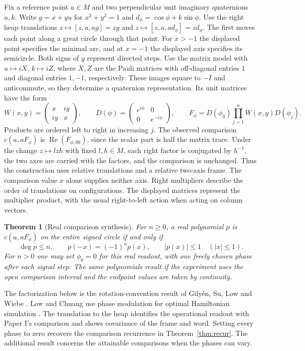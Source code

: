 \documentclass[11pt,reqno]{amsart}
\newtheorem{theorem}{Theorem}[section]
\theoremstyle{definition}
\theoremstyle{remark}
\numberwithin{equation}{section}
\newcommand{\re}{\operatorname{Re}}
\newcommand{\hp}[3]{[#1,#2,#3]}
\begin{document}
Fix a reference point $a\in M$ and two perpendicular unit imaginary quaternions $u,k$. Write $g=x+yu$ for $x^2+y^2=1$ and $d_\phi=\cos\phi+k\sin\phi$. Use the right heap translations $z\mapsto\hp{z}{a}{ag}=zg$ and $z\mapsto\hp{z}{a}{ad_\phi}=zd_\phi$. The first moves each point along a great circle through that point. For $x>-1$ the displaced point specifies the minimal arc, and at $x=-1$ the displayed axis specifies its semicircle. Both signs of $y$ represent directed steps. Use the matrix model with $u\mapsto iX$, $k\mapsto iZ$, where $X,Z$ are the Pauli matrices with off-diagonal entries $1$ and diagonal entries $1,-1$, respectively. These images square to $-I$ and anticommute, so they determine a quaternion representation. Its unit matrices have the form
\[
 W(x,y)=\begin{pmatrix}x&iy\\iy&x\end{pmatrix},\qquad
 D(\phi)=\begin{pmatrix}e^{i\phi}&0\\0&e^{-i\phi}\end{pmatrix},\qquad
 F_\phi=D(\phi_0)\prod_{j=1}^n W(x,y)D(\phi_j).
\]
Products are ordered left to right in increasing $j$. The observed comparison $c(a,aF_\phi)$ is $\re(F_{\phi,00})$, since the scalar part is half the matrix trace. Under the change $z\mapsto lzh$ with fixed $l,h\in M$, each right factor is conjugated by $h^{-1}$, the two axes are carried with the factors, and the comparison is unchanged. Thus the construction uses relative translations and a relative two-axis frame. The comparison value $x$ alone supplies neither axis. Right multipliers describe the order of translations on configurations. The displayed matrices represent the multiplier product, with the usual right-to-left action when acting on column vectors.

\begin{theorem}[Real comparison synthesis]\label{m4:real}
For $n\ge0$, a real polynomial $p$ is $c(a,aF_\phi)$ on the entire signed circle if and only if
\[
 \deg p\le n,\qquad p(-x)=(-1)^n p(x),\qquad
 |p(x)|\le1\quad (|x|\le1).
\]
For $n>0$ one may set $\phi_0=0$ for this real readout, with one freely chosen phase after each signal step. The same polynomials result if the experiment uses the open comparison interval and the endpoint values are taken by continuity.
\end{theorem}

The factorization below is the rotation-convention result of Gily\'en, Su, Low and Wiebe \cite[Theorems 3 and 5 and Lemma 6, arXiv v1]{m4:GSLW}. Low and Chuang use phase modulation for optimal Hamiltonian simulation \cite{m4:LC}. The translation to the heap identifies the operational readout with Paper I's comparison and shows covariance of the frame and word. Setting every phase to zero recovers the comparison recurrence in Theorem~\ref{thm:recur}. The additional result concerns the attainable comparisons when the phases can vary.
\end{document}
